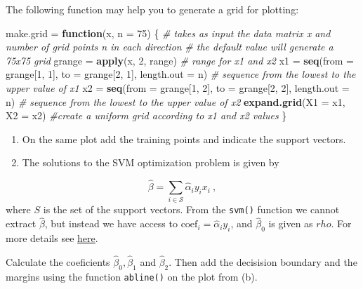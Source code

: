 \documentclass[]{article}
\newenvironment{Shaded}{\begin{snugshade}}{\end{snugshade}}
\newcommand{\CommentTok}[1]{\textcolor[rgb]{0.56,0.35,0.01}{\textit{#1}}}
\newcommand{\ControlFlowTok}[1]{\textcolor[rgb]{0.13,0.29,0.53}{\textbf{#1}}}
\newcommand{\DataTypeTok}[1]{\textcolor[rgb]{0.13,0.29,0.53}{#1}}
\newcommand{\DecValTok}[1]{\textcolor[rgb]{0.00,0.00,0.81}{#1}}
\newcommand{\KeywordTok}[1]{\textcolor[rgb]{0.13,0.29,0.53}{\textbf{#1}}}
\newcommand{\NormalTok}[1]{#1}
\newcommand{\StringTok}[1]{\textcolor[rgb]{0.31,0.60,0.02}{#1}}
\begin{document}
The following function may help you to generate a grid for plotting:

\begin{Shaded}
\begin{Highlighting}[]
\NormalTok{make.grid =}\StringTok{ }\ControlFlowTok{function}\NormalTok{(x, }\DataTypeTok{n =} \DecValTok{75}\NormalTok{) \{}
    \CommentTok{# takes as input the data matrix x and number of grid points n in each direction}
    \CommentTok{# the default value will generate a 75x75 grid}
\NormalTok{    grange =}\StringTok{ }\KeywordTok{apply}\NormalTok{(x, }\DecValTok{2}\NormalTok{, range)  }\CommentTok{# range for x1 and x2}
\NormalTok{    x1 =}\StringTok{ }\KeywordTok{seq}\NormalTok{(}\DataTypeTok{from =}\NormalTok{ grange[}\DecValTok{1}\NormalTok{, }\DecValTok{1}\NormalTok{], }\DataTypeTok{to =}\NormalTok{ grange[}\DecValTok{2}\NormalTok{, }\DecValTok{1}\NormalTok{], }\DataTypeTok{length.out =}\NormalTok{ n)  }\CommentTok{# sequence from the lowest to the upper value of x1}
\NormalTok{    x2 =}\StringTok{ }\KeywordTok{seq}\NormalTok{(}\DataTypeTok{from =}\NormalTok{ grange[}\DecValTok{1}\NormalTok{, }\DecValTok{2}\NormalTok{], }\DataTypeTok{to =}\NormalTok{ grange[}\DecValTok{2}\NormalTok{, }\DecValTok{2}\NormalTok{], }\DataTypeTok{length.out =}\NormalTok{ n)  }\CommentTok{# sequence from the lowest to the upper value of x2}
    \KeywordTok{expand.grid}\NormalTok{(}\DataTypeTok{X1 =}\NormalTok{ x1, }\DataTypeTok{X2 =}\NormalTok{ x2)  }\CommentTok{#create a uniform grid according to x1 and x2 values}
\NormalTok{\}}
\end{Highlighting}
\end{Shaded}

\begin{enumerate}
\def\labelenumi{(\alph{enumi})}
\setcounter{enumi}{1}
\item
  On the same plot add the training points and indicate the support
  vectors.
\item
  The solutions to the SVM optimization problem is given by
\end{enumerate}

\[
\hat{\beta}= \sum_{i\in \mathcal{S}} \hat\alpha_i y_i x_i \ ,
\] where \(S\) is the set of the support vectors. From the
\texttt{svm()} function we cannot extract \(\hat \beta\), but instead we
have access to \(\text{coef}_i = \hat\alpha_i y_i\), and \(\hat\beta_0\)
is given as \(rho.\) For more details see
\href{https://cran.r-project.org/web/packages/e1071/vignettes/svminternals.pdf}{here}.

Calculate the coeficients \(\hat\beta_0, \hat\beta_1\) and
\(\hat\beta_2.\) Then add the decisision boundary and the margins using
the function \texttt{abline()} on the plot from (b).
\end{document}

